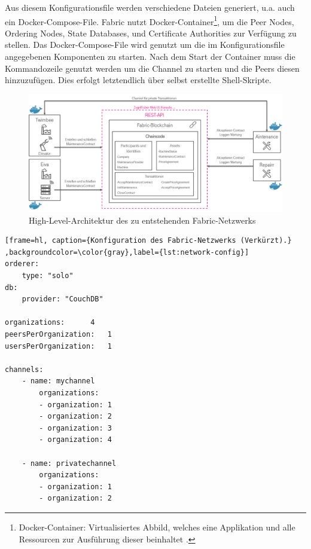 Aus diesem Konfigurationsfile werden verschiedene Dateien generiert, u.a. auch ein Docker-Compose-File. Fabric nutzt Docker-Container\footnote{Docker-Container: Virtualisiertes Abbild, welches eine Applikation und alle Ressourcen zur Ausführung dieser beinhaltet \cite{DockerTeamWhatcontainer2017}.}, um die Peer Nodes, Ordering Nodes, State Databases, und Certificate Authorities zur Verfügung zu stellen. Das Docker-Compose-File wird genutzt um die im Konfigurationsfile angegebenen Komponenten zu starten. Nach dem Start der Container muss die Kommandozeile genutzt werden um die Channel zu starten und die Peers diesen hinzuzufügen. Dies erfolgt letztendlich über selbst erstellte Shell-Skripte. 

\begin{figure}[!htbp]
    \centering
      \includegraphics[width=1.0\textwidth,angle=0]{images/architecture_highlevel}
       \caption{High-Level-Architektur des zu entstehenden Fabric-Netzwerks}
      \label{fig:architecture-high}
\end{figure}

\begin{lstfloat}
\begin{lstlisting}[frame=hl, caption={Konfiguration des Fabric-Netzwerks (Verkürzt).} ,backgroundcolor=\color{gray},label={lst:network-config}]
orderer:
    type: "solo"
db:
    provider: "CouchDB"

organizations:      4
peersPerOrganization:   1
usersPerOrganization:   1

channels:
    - name: mychannel
        organizations:
        - organization: 1
        - organization: 2
        - organization: 3
        - organization: 4

    - name: privatechannel
        organizations:
        - organization: 1
        - organization: 2
\end{lstlisting} 
\end{lstfloat}

